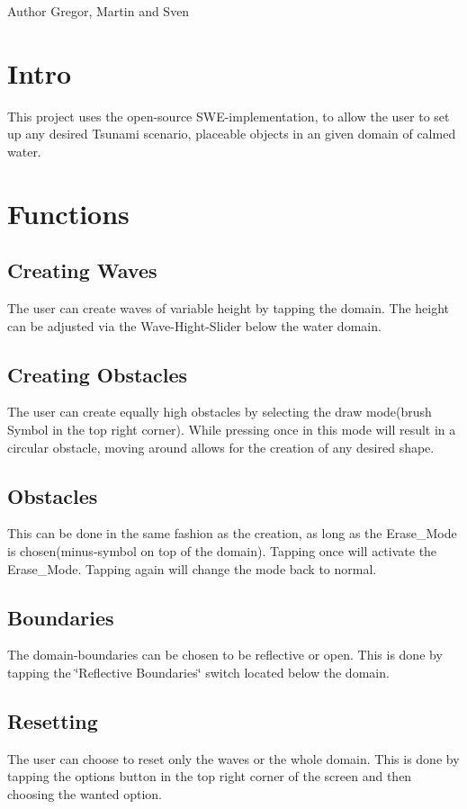 \begin{DoxyAuthor}{Author}
Gregor, Martin and Sven
\end{DoxyAuthor}
\hypertarget{index_i}{}\section{Intro}\label{index_i}
This project uses the open-\/source S\+W\+E-\/implementation, to allow the user to set up any desired Tsunami scenario, placeable objects in an given domain of calmed water.\hypertarget{index_f}{}\section{Functions}\label{index_f}
\hypertarget{index_sf}{}\subsection{Creating Waves}\label{index_sf}
The user can create waves of variable height by tapping the domain. The height can be adjusted via the Wave-\/\+Hight-\/\+Slider below the water domain. \hypertarget{index_sf1}{}\subsection{Creating Obstacles}\label{index_sf1}
The user can create equally high obstacles by selecting the draw mode(brush Symbol in the top right corner). While pressing once in this mode will result in a circular obstacle, moving around allows for the creation of any desired shape. \hypertarget{index_Removing}{}\subsection{Obstacles}\label{index_Removing}
This can be done in the same fashion as the creation, as long as the Erase\+\_\+\+Mode is chosen(minus-\/symbol on top of the domain). Tapping once will activate the Erase\+\_\+\+Mode. Tapping again will change the mode back to normal. \hypertarget{index_Boundaries}{}\subsection{Boundaries}\label{index_Boundaries}
The domain-\/boundaries can be chosen to be reflective or open. This is done by tapping the \char`\"{}\+Reflective Boundaries\char`\"{} switch located below the domain. \hypertarget{index_Resetting}{}\subsection{Resetting}\label{index_Resetting}
The user can choose to reset only the waves or the whole domain. This is done by tapping the options button in the top right corner of the screen and then choosing the wanted option. 